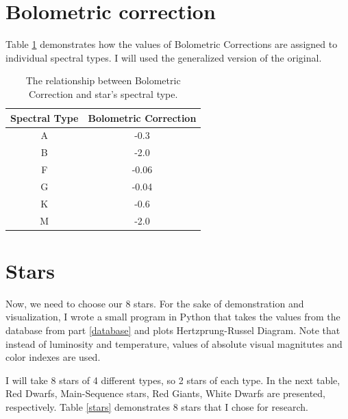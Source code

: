 \documentclass{IEEEtran}
\begin{document}
  
  \section{Bolometric correction}
  
  Table \ref{bc} demonstrates how the values of Bolometric Corrections are assigned to individual spectral types. I will used the generalized version of the original.\\
  
  
  \begin{table}[h!]
    \begin{center}
      \centering
      \caption{The relationship between Bolometric Correction and star's spectral type.}
      \begin{tabular}{c | c}
        \textbf{Spectral Type} & \textbf{Bolometric Correction} \\
        \hline
        A & -0.3\\
        B & -2.0\\
        F & -0.06\\
        G & -0.04\\
        K & -0.6\\
        M & -2.0\\
      \end{tabular}
      \label{bc}
    \end{center}
  \end{table}
  
  \section{Stars}
  
  Now, we need to choose our 8 stars. For the sake of demonstration and visualization, I wrote a small program in Python that takes the values from the database from part \ref{database} and plots Hertzprung-Russel Diagram. Note that instead of luminosity and temperature, values of absolute visual magnitutes and color indexes are used.
  
  I will take 8 stars of 4 different types, so 2 stars of each type. In the next table, Red Dwarfs, Main-Sequence stars, Red Giants, White Dwarfs are presented, respectively. Table \ref{stars} demonstrates 8 stars that I chose for research.
  
\end{document}
